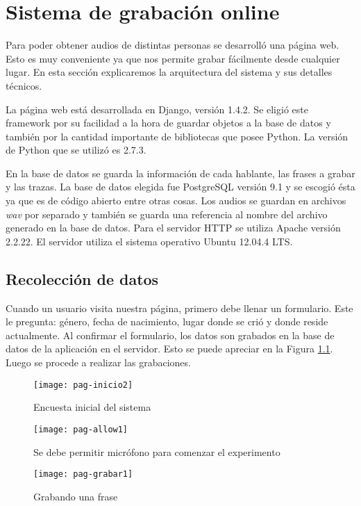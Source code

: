 \chapter{Sistema de grabación online}

Para poder obtener audios de distintas personas se desarrolló una página web. Esto es muy conveniente ya que nos permite grabar fácilmente desde cualquier lugar. En esta sección explicaremos la arquitectura del sistema y sus detalles técnicos.

La página web está desarrollada en Django, versión 1.4.2. Se eligió este framework por su facilidad a la hora de guardar objetos a la base de datos y también por la cantidad importante de bibliotecas que posee Python. La versión de Python que se utilizó es 2.7.3. 

En la base de datos se guarda la información de cada hablante, las frases a grabar y las trazas. La base de datos elegida fue PostgreSQL versión 9.1 y se escogió ésta ya que es de código abierto entre otras cosas. Los audios se guardan en archivos \textit{wav} por separado y también se guarda una referencia al nombre del archivo generado en la base de datos. Para el servidor HTTP se utiliza Apache versión 2.2.22. El servidor utiliza el sistema operativo Ubuntu 12.04.4 LTS.

\section{Recolección de datos}

Cuando un usuario visita nuestra página, primero debe llenar un formulario. Este le pregunta: género, fecha de nacimiento, lugar donde se crió y donde reside actualmente. Al confirmar el formulario, los datos son grabados en la base de datos de la aplicación en el servidor. Esto se puede apreciar en la Figura \ref{figEncuesta}. Luego se procede a realizar las grabaciones. 

\begin{figure}[h!]
    \centerline{\texttt{[image: pag-inicio2]} }
    \caption{Encuesta inicial del sistema}
    \label{figEncuesta}
\end{figure}

\begin{figure}[h!]
    \centerline{\texttt{[image: pag-allow1]} }
    \caption{Se debe permitir micrófono para comenzar el experimento}
    \label{allowmic}
\end{figure}

\begin{figure}[h!]
    \centerline{\texttt{[image: pag-grabar1]} }
    \caption{Grabando una frase}
    \label{grabando}
\end{figure}

